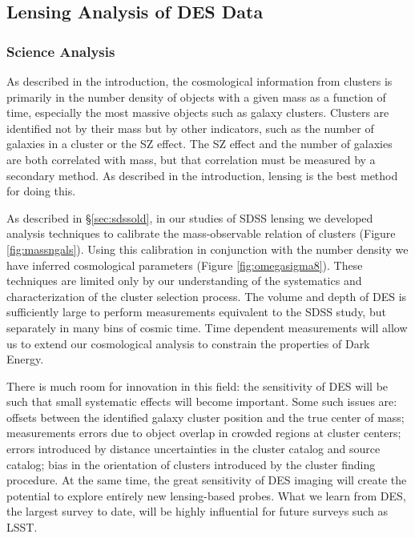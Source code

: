 \documentclass[12pt]{article}
\begin{document}
\subsection{Lensing Analysis of DES Data} \label{sec:deslensing}

\subsubsection{Science Analysis}

As described in the introduction, the cosmological information from clusters is
primarily in the number density of objects with a given mass as a function of
time, especially the most massive objects such as galaxy clusters.  Clusters
are identified not by their mass but by other indicators, such as the number of
galaxies in a cluster or the SZ effect.  The SZ effect and the number of
galaxies are both correlated with mass, but that correlation must be measured
by a secondary method.  As described in the introduction, lensing is the best
method for doing this.  

As described in \S\ref{sec:sdssold}, in our studies of SDSS lensing we
developed analysis techniques to calibrate the mass-observable relation of
clusters (Figure \ref{fig:massngals}).  Using this calibration in conjunction
with the number density we have inferred cosmological parameters (Figure
\ref{fig:omegasigma8}).  These techniques are limited only by our understanding
of the systematics and characterization of the cluster selection process.  The
volume and depth of DES is sufficiently large to perform measurements
equivalent to the SDSS study, but separately in many bins of cosmic time.  Time
dependent measurements will allow us to extend our cosmological analysis to
constrain the properties of Dark Energy.

There is much room for innovation in this field: the sensitivity of DES will be
such that small systematic effects will become important. Some such issues are:
offsets between the identified galaxy cluster position and the true center of
mass; measurements errors due to object overlap in crowded regions at cluster
centers; errors introduced by distance uncertainties in the cluster catalog and
source catalog; bias in the orientation of clusters introduced by the cluster
finding procedure.  At the same time, the great sensitivity of DES imaging will
create the potential to explore entirely new lensing-based probes.  What we
learn from DES, the largest survey to date, will be highly influential for
future surveys such as LSST.
\end{document}
